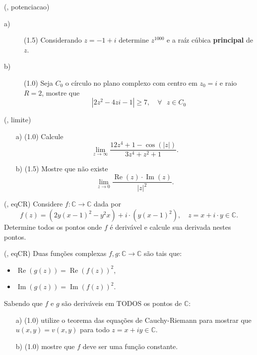 
\linebreak

(\problem, potenciacao)
\begin{description}
\item[a)] (1.5) Considerando $z=-1+i$ determine $z^{1000}$ e a ra\'iz c\'ubica \textbf{principal} de $z$.
\item[b)] (1.0) Seja $C_0$ o c\'irculo no plano complexo com centro em $z_0=i$ e raio $R=2$, mostre que 
\[\left| 2z^2-4zi-1  \right| \geq 7, \quad \forall \text{ } z\in C_0\]
\end{description}

\linebreak

(\problem, limite)
\begin{itemize}
\item[a)] (1.0) Calcule \[\lim_{z\rightarrow \infty} \frac{12z^4+1-\cos\left(|z|\right)}{3z^4+z^2+1}.\]
\item[b)] (1.5) Mostre que n\~ao existe \[\lim_{z\rightarrow 0} \frac{\operatorname{Re}(z) \cdot \operatorname{Im}(z) }{|z|^2}.\]
\end{itemize}

\linebreak

(\problem, eqCR)
Considere $f:\mathbb C \to \mathbb C$ dada por
\[f(z)= (2y(x-1)^2-y^2x) + i\cdot (y(x-1)^2), \quad z=x+i\cdot y \in \mathbb C.\]
Determine todos os pontos onde $f$ \'e deriv\'avel e calcule sua derivada nestes pontos.

\linebreak

(\problem, eqCR)
Duas fun\c c\~oes complexas $f,g:\mathbb C \to \mathbb C$ s\~ao tais que:
\begin{itemize}
\item $\operatorname{Re} (g(z)) = \operatorname{Re}(f(z))^2$,
\item $\operatorname{Im}(g(z)) = \operatorname{Im}(f(z))^2$.
\end{itemize}
Sabendo que $f$ e $g$ s\~ao deriv\'aveis em TODOS os pontos de $\mathbb C$:

\begin{itemize}
\item[a)](1.0) utilize o teorema das equa\c c\~oes de Cauchy-Riemann para mostrar que $u(x,y) = v(x,y)$ para todo $z=x+iy\in \mathbb C$.
\item[b)](1.0) mostre que $f$ deve ser uma fun\c c\~ao constante.
\end{itemize}

